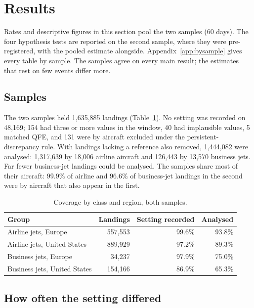 \documentclass[11pt]{article}
\begin{document}
\section{Results}\label{sec:results}

Rates and descriptive figures in this section pool the two samples (60 days). The four hypothesis tests are reported on the second sample, where they were pre-registered, with the pooled estimate alongside. Appendix~\ref{app:bysample} gives every table by sample. The samples agree on every main result; the estimates that rest on few events differ more.

\subsection{Samples}

The two samples held 1{,}635{,}885 landings (Table~\ref{tab:coverage}). No setting was recorded on 48{,}169; 154 had three or more values in the window, 40 had implausible values, 5 matched QFE, and 131 were by aircraft excluded under the persistent-discrepancy rule. With landings lacking a reference also removed, 1{,}444{,}082 were analysed: 1{,}317{,}639 by 18{,}006 airline aircraft and 126{,}443 by 13{,}570 business jets. Far fewer business-jet landings could be analysed. The samples share most of their aircraft: 99.9\% of airline and 96.6\% of business-jet landings in the second were by aircraft that also appear in the first.

\begin{table}[h]
\centering
\caption{Coverage by class and region, both samples.}\label{tab:coverage}
\begin{tabular}{lrrr}
\toprule
Group & Landings & Setting recorded & Analysed \\
\midrule
Airline jets, Europe & 557{,}553 & 99.6\% & 93.8\% \\
Airline jets, United States & 889{,}929 & 97.2\% & 89.3\% \\
Business jets, Europe & 34{,}237 & 97.9\% & 75.0\% \\
Business jets, United States & 154{,}166 & 86.9\% & 65.3\% \\
\bottomrule
\end{tabular}
\end{table}

\subsection{How often the setting differed}
\end{document}
